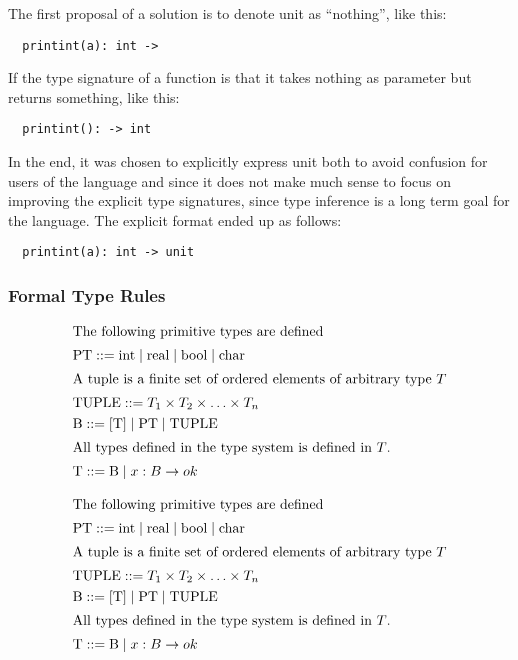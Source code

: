 The first proposal of a solution is to denote unit as \enquote{nothing}, like this:
\begin{verbatim}
  printint(a): int ->
\end{verbatim}
If the type signature of a function is that it takes nothing as parameter but returns something, like this:
\begin{verbatim}
  printint(): -> int
\end{verbatim}

In the end, it was chosen to explicitly express unit both to avoid confusion for users of the language and since it does not make much sense to focus on improving the explicit type signatures, since type inference is a long term goal for the language. The explicit format ended up as follows:
\begin{verbatim}
  printint(a): int -> unit
\end{verbatim}

\subsubsection{Formal Type Rules}

\begin{align*}
\intertext{The following primitive types are defined}
&\text{PT} ::= \text{int} \mid \text{real} \mid \text{bool} \mid \text{char}
\\
\intertext{A tuple is a finite set of ordered elements of arbitrary type $T$}
&\text{TUPLE} ::= T_1 \times T_2 \times \ldots \times T_n
\\            
&\text{B} ::=  \left[ \text{T} \right] \mid \text{PT} \mid \text{TUPLE}
\\            
\intertext{All types defined in the type system is defined in $T$.}
&\text{T} ::= \text{B} \mid x : B \rightarrow ok
\end{align*}

\begin{align*}
\intertext{The following primitive types are defined}
&\text{PT} ::= \text{int} \mid \text{real} \mid \text{bool} \mid \text{char}
\\
\intertext{A tuple is a finite set of ordered elements of arbitrary type $T$}
&\text{TUPLE} ::= T_1 \times T_2 \times \ldots \times T_n
\\            
&\text{B} ::=  \left[ \text{T} \right] \mid \text{PT} \mid \text{TUPLE}
\\            
\intertext{All types defined in the type system is defined in $T$.}
&\text{T} ::= \text{B} \mid x : B \rightarrow ok
\end{align*}

